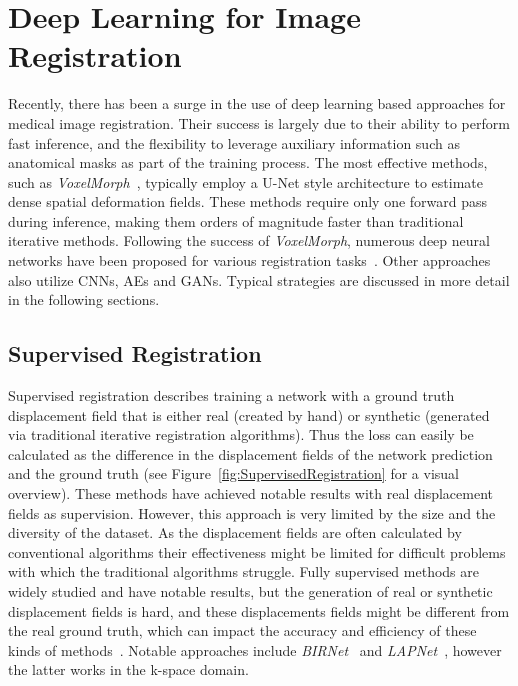 \documentclass[english,version-2022-01]{uzl-thesis} %
\begin{document}
\section{Deep Learning for Image Registration} \label{Sec:DLImageRegistration}
Recently, there has been a surge in the use of deep learning based approaches for medical image registration. Their success is largely due to their ability to perform fast inference, and the flexibility to leverage auxiliary information such as anatomical masks as part of the training process. The most effective methods, such as \emph{VoxelMorph}~\cite{Voxelmorph}, typically employ a U-Net style architecture to estimate dense spatial deformation fields. These methods require only one forward pass during inference, making them orders of magnitude faster than traditional iterative methods. Following the success of \emph{VoxelMorph}, numerous deep neural networks have been proposed for various registration tasks~\cite{Fourier-Net+}. Other approaches also utilize CNNs, AEs and GANs. Typical strategies are discussed in more detail in the following sections.

\subsection{Supervised Registration} \label{SubSec:SupervisedRegistration}
Supervised registration describes training a network with a ground truth displacement field that is either real (created by hand) or synthetic (generated via traditional iterative registration algorithms). Thus the loss can easily be calculated as the difference in the displacement fields of the network prediction and the ground truth (see Figure~\ref{fig:SupervisedRegistration} for a visual overview). These methods have achieved notable results with real displacement fields as supervision. However, this approach is very limited by the size and the diversity of the dataset. As the displacement fields are often calculated by conventional algorithms their effectiveness might be limited for difficult problems with which the traditional algorithms struggle. Fully supervised methods are widely studied and have notable results, but the generation of real or synthetic displacement fields is hard, and these displacements fields might be different from the real ground truth, which can impact the accuracy and efficiency of these kinds of methods~\cite{Zou2022}. Notable approaches include \emph{BIRNet}~\cite{BIRNet} and \emph{LAPNet}~\cite{LAPNet}, however the latter works in the k-space domain.
\end{document}
